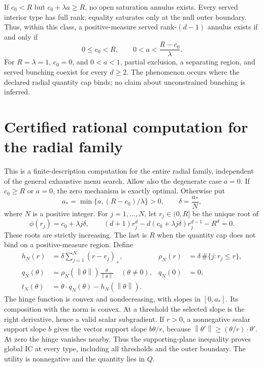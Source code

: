 \documentclass[11pt,a4paper]{article}
\numberwithin{equation}{section}
\newcommand{\norm}[1]{\left\lVert #1\right\rVert}
\begin{document}
If \(c_0<R\) but \(c_0+\lambda a\ge R\), no open saturation annulus
exists. Every served interior type has full rank; equality saturates
only at the null outer boundary.
Thus, within this class, a positive-measure served rank-\((d-1)\)
annulus exists if and only if
\begin{equation}\label{eq:bunchcondition}
 0\le c_0<R,\qquad 0<a<\frac{R-c_0}{\lambda}.
\end{equation}
For \(R=\lambda=1\), \(c_0=0\), and \(0<a<1\), partial exclusion,
a separating region, and served bunching coexist for every \(d\ge2\).
The phenomenon occurs where the declared radial quantity cap binds;
no claim about unconstrained bunching is inferred.

\section{Certified rational computation for the radial family}\label{sec:radialcompute}
This is a finite-description computation for the entire radial family,
independent of the general exhaustive menu search.
Allow also the degenerate case \(a=0\).
If \(c_0\ge R\) or \(a=0\), the zero mechanism is exactly optimal.
Otherwise put
\[
 a_*=\min\{a,(R-c_0)/\lambda\}>0,\qquad
 \delta=\frac{a_*}{N},
\]
where \(N\) is a positive integer.
For \(j=1,\ldots,N\), let \(r_j\in(0,R]\) be the unique root of
\begin{equation}\label{eq:hingeroot}
 \phi(r_j)=c_0+\lambda j\delta,\qquad
 (d+1)r_j^d-d(c_0+\lambda j\delta)r_j^{d-1}-R^d=0.
\end{equation}
These roots are strictly increasing. The last is \(R\) when the
quantity cap does not bind on a positive-measure region.
Define
\begin{align*}
 h_N(r)&=\delta\sum_{j=1}^N(r-r_j)_+,&
 \rho_N(r)&=\delta\,\#\{j:r_j\le r\},\\
 q_N(\theta)&=\rho_N(\norm\theta)\frac{\theta}{\norm\theta}
       \quad(\theta\ne0),&
 q_N(0)&=0,\\
 t_N(\theta)&=\theta\cdot q_N(\theta)-h_N(\norm\theta).
\end{align*}
The hinge function is convex and nondecreasing, with slopes in
\([0,a_*]\). Its composition with the norm is convex.
At a threshold the selected slope is the right derivative, hence
a valid scalar subgradient. If \(r>0\), a nonnegative scalar support
slope \(b\) gives the vector support slope \(b\theta/r\), because
\(\norm{\theta'}\ge(\theta/r)\cdot\theta'\).
At zero the hinge vanishes nearby.
Thus the supporting-plane inequality proves global IC at every type,
including all thresholds and the outer boundary.
The utility is nonnegative and the quantity lies in \(Q\).
\end{document}
